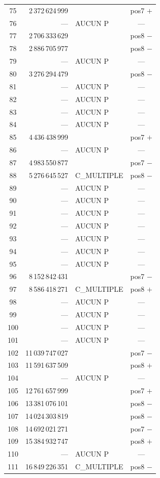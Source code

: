 \documentclass[11pt,a4paper]{article}
\begin{document}
{\begin{longtable}{@{}c r l c@{}}
75 & 2\,372\,624\,999 & & pos7 $+$ \\
76 & --- & AUCUN P & --- \\
77 & 2\,706\,333\,629 & & pos8 $-$ \\
78 & 2\,886\,705\,977 & & pos8 $-$ \\
79 & --- & AUCUN P & --- \\
80 & 3\,276\,294\,479 & & pos8 $-$ \\
81 & --- & AUCUN P & --- \\
82 & --- & AUCUN P & --- \\
83 & --- & AUCUN P & --- \\
84 & --- & AUCUN P & --- \\
85 & 4\,436\,438\,999 & & pos7 $+$ \\
86 & --- & AUCUN P & --- \\
87 & 4\,983\,550\,877 & & pos7 $-$ \\
88 & 5\,276\,645\,527 & C\_MULTIPLE & pos8 $-$ \\
89 & --- & AUCUN P & --- \\
90 & --- & AUCUN P & --- \\
91 & --- & AUCUN P & --- \\
92 & --- & AUCUN P & --- \\
93 & --- & AUCUN P & --- \\
94 & --- & AUCUN P & --- \\
95 & --- & AUCUN P & --- \\
96 & 8\,152\,842\,431 & & pos7 $-$ \\
97 & 8\,586\,418\,271 & C\_MULTIPLE & pos8 $+$ \\
98 & --- & AUCUN P & --- \\
99 & --- & AUCUN P & --- \\
100 & --- & AUCUN P & --- \\
101 & --- & AUCUN P & --- \\
102 & 11\,039\,747\,027 & & pos7 $-$ \\
103 & 11\,591\,637\,509 & & pos8 $+$ \\
104 & --- & AUCUN P & --- \\
105 & 12\,761\,657\,999 & & pos7 $+$ \\
106 & 13\,381\,076\,101 & & pos8 $-$ \\
107 & 14\,024\,303\,819 & & pos8 $-$ \\
108 & 14\,692\,021\,271 & & pos7 $-$ \\
109 & 15\,384\,932\,747 & & pos8 $+$ \\
110 & --- & AUCUN P & --- \\
111 & 16\,849\,226\,351 & C\_MULTIPLE & pos8 $-$ \\
\bottomrule
\end{longtable}}
\end{document}
